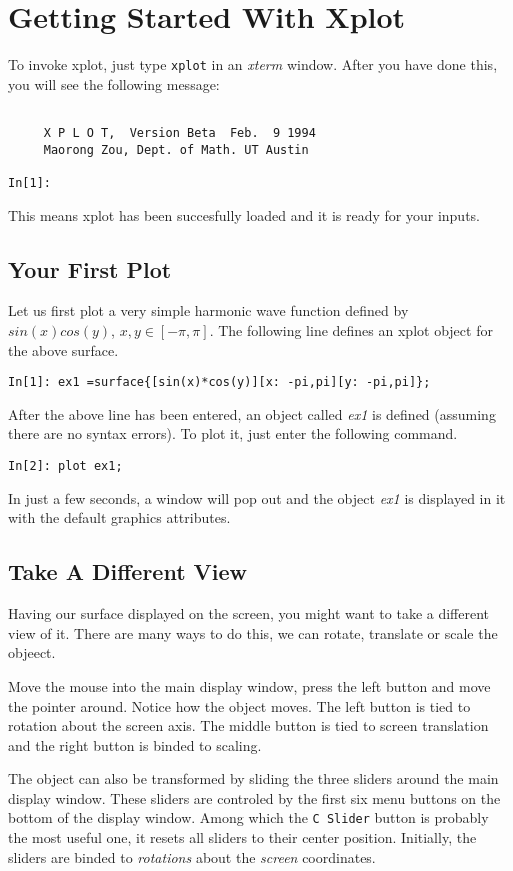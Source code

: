 \section{Getting Started With Xplot}
To invoke  xplot, just type \verb+xplot+ in an
{\it xterm} window.
After you have done this, you will see the following message:
\begin{verbatim}

     X P L O T,  Version Beta  Feb.  9 1994
     Maorong Zou, Dept. of Math. UT Austin       

In[1]:

\end{verbatim}
This means xplot has been succesfully loaded and it is
ready for your inputs.

\subsection{Your First Plot}
Let us first plot a very simple harmonic wave function defined by
$sin(x)cos(y)$, $ x,y\in [-\pi,\pi].$
The following line defines
an xplot object for the above surface.
\begin{verbatim}
In[1]: ex1 =surface{[sin(x)*cos(y)][x: -pi,pi][y: -pi,pi]};
\end{verbatim}
After the above line has been entered, an object called 
{\it ex1} is defined (assuming there are no syntax errors).
To plot it, just enter the following command.
\begin{verbatim}
In[2]: plot ex1;
\end{verbatim}
In just a few seconds, a window will pop out and the object 
{\it ex1 } is displayed in it with the default graphics 
attributes. 
 
\subsection{Take A Different View}
Having our surface displayed on the screen, you might want to
take a different view of it. There are many ways to do this,
we can rotate, translate or scale the objeect.

Move the mouse into the main display window, press
the left button and move the pointer around. Notice
how the object moves. The left button is tied to 
rotation about the screen axis. The middle button is tied
to screen translation and the right button is binded to
scaling.

The object can also be transformed by sliding the three
sliders around the main display window. 
These sliders are controled by the first six menu buttons on the bottom
of the display window. Among which the \verb+C Slider+
button is probably the most useful one, it resets all sliders
to their center position. 
Initially, the sliders are binded to {\it rotations}
about the {\it screen } coordinates.

